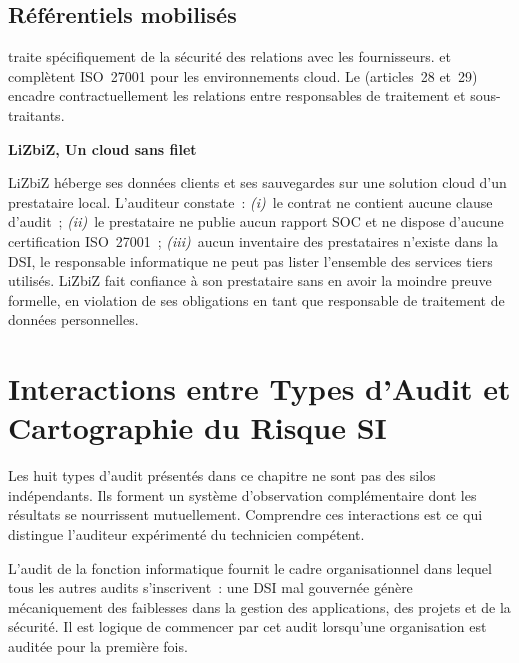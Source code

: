 \subsection{Référentiels mobilisés}

 traite spécifiquement de la sécurité des relations avec les
fournisseurs.  et  complètent ISO~27001 pour les
environnements cloud. Le  (articles~28 et~29) encadre contractuellement
les relations entre responsables de traitement et sous-traitants.

\begin{boxlizbiz}
\textbf{LiZbiZ, Un cloud sans filet}

LiZbiZ héberge ses données clients et ses sauvegardes sur une solution cloud d'un
prestataire local. L'auditeur constate~: \textit{(i)}~le contrat ne contient aucune
clause d'audit~; \textit{(ii)}~le prestataire ne publie aucun rapport SOC et ne dispose
d'aucune certification ISO~27001~; \textit{(iii)}~aucun inventaire des prestataires
n'existe dans la DSI, le responsable informatique ne peut pas lister l'ensemble des
services tiers utilisés. LiZbiZ fait confiance à son prestataire sans en avoir la
moindre preuve formelle, en violation de ses obligations en tant que responsable de
traitement de données personnelles.
\end{boxlizbiz}


\section{Interactions entre Types d'Audit et Cartographie du Risque SI}
\label{sec:interactions-types}

Les huit types d'audit présentés dans ce chapitre ne sont pas des silos indépendants.
Ils forment un système d'observation complémentaire dont les résultats se nourrissent
mutuellement. Comprendre ces interactions est ce qui distingue l'auditeur expérimenté
du technicien compétent.

L'audit de la fonction informatique fournit le cadre organisationnel dans lequel tous
les autres audits s'inscrivent~: une DSI mal gouvernée génère mécaniquement des
faiblesses dans la gestion des applications, des projets et de la sécurité. Il est
logique de commencer par cet audit lorsqu'une organisation est auditée pour la
première fois.

